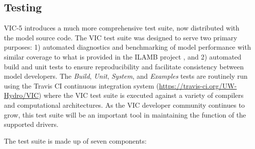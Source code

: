 \documentclass[gmd, manuscript]{copernicus}
\begin{document}
  \subsection{Testing}
    \label{sec:testing}
    VIC-5 introduces a much more comprehensive test suite, now distributed with the model source code. The VIC test suite was designed to serve two primary purposes: 1) automated diagnostics and benchmarking of model performance with similar coverage to what is provided in the ILAMB project \citep{Luo_2012}, and 2) automated build and unit tests to ensure reproducibility and facilitate consistency between model developers. The \textit{Build}, \textit{Unit}, \textit{System}, and \textit{Examples} tests are routinely run using the Travis CI continuous integration system (\url{https://travis-ci.org/UW-Hydro/VIC}) where the VIC test suite is executed against a variety of compilers and computational architectures. As the VIC developer community continues to grow, this test suite will be an important tool in maintaining the function of the supported drivers.

    The test suite is made up of seven components:
\end{document}
